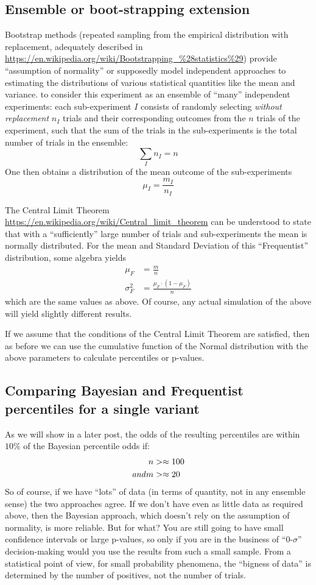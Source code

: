\documentclass[12pt]{report}
\newcommand{\beq}{\begin{equation}} %
\newcommand{\eeq}{\end{equation}} %
\newcommand{\bdm}{\begin{displaymath}} %
\newcommand{\edm}{\end{displaymath}} %
\begin{document}
\subsection{Ensemble or boot-strapping extension\label{sec:ensemble}}
Bootstrap methods (repeated sampling from the empirical distribution with
replacement, adequately described in
\url{https://en.wikipedia.org/wiki/Bootstrapping_\%28statistics\%29})
provide ``assumption of normality'' or supposedly model independent
approaches to estimating the distributions of various statistical quantities
like the mean and variance.
to consider this experiment
as an ensemble of ``many'' independent experiments: each sub-experiment \(I\)
consists of randomly selecting {\em without replacement} \(n_I\) trials
and their corresponding outcomes from the \(n\) trials of the experiment,
such that the sum of the trials in the sub-experiments is the total
number of trials in the ensemble:
\bdm
\sum_{I}n_I = n
\edm
One then obtains a distribution of the mean outcome of the sub-experiments
\bdm
\mu_I = \frac{m_I}{n_I}
\edm

The Central Limit Theorem \url{https://en.wikipedia.org/wiki/Central_limit_theorem} can be understood to state
that with a ``sufficiently'' large number of trials and
sub-experiments the mean is normally distributed. For the mean and
Standard Deviation of this ``Frequentist'' distribution, some algebra yields
\beq
\begin{split}
  \mu_F &= \frac{m}{n}\\
  \sigma_F^2 &= \frac{\mu_F\cdot(1-\mu_F)}{n}
\end{split}
\eeq
which are the same values as above.
Of course, any actual simulation of the above will yield slightly different
results.

If we assume that the conditions of the Central Limit Theorem are satisfied,
then as before we can use the cumulative function of the Normal distribution
with the above parameters to
calculate percentiles or p-values.

\subsection{Comparing Bayesian and Frequentist percentiles for a single variant}
As we will show in a later post, the odds of the resulting percentiles
are within \(10\%\) of the Bayesian percentile odds if:
\beq
\begin{split}
  n &>\approx 100\\
 {\it and} m &>\approx 20
\end{split}
\eeq
So of course, if we have ``lots'' of data (in terms of quantity,
not in any ensemble sense) the two approaches agree. If we don't have even as
little data as required above, then the Bayesian approach,
which doesn't rely on the assumption of normality, is more reliable. But for
what? You are still going to have small confidence intervals or large
p-values, so only if you are in the business of ``0-\(\sigma\)''
decision-making would you use the results from such a small sample. From a
statistical point of view, for small probability phenomena, the ``bigness of
data'' is determined by the number of positives, not the number of trials.
\end{document}
